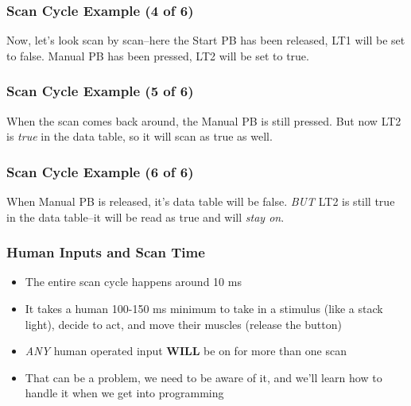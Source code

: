 \begin{frame}
    \frametitle{Scan Cycle Example (4 of 6)}

    \begin{figure}
        \centering
        \resizebox{0.75\linewidth}{!}{
            
        }
    \end{figure}

    \vspace{0.5em}
    \centering
    {\footnotesize Now, let's look scan by scan--here the Start PB has been released, LT1 will be set to false. Manual PB has been pressed, LT2 will be set to true.\par}
\end{frame}

\begin{frame}
    \frametitle{Scan Cycle Example (5 of 6)}

    \begin{figure}
        \centering
        \resizebox{0.75\linewidth}{!}{
            
        }
    \end{figure}

    \vspace{0.5em}
    \centering
    {\footnotesize When the scan comes back around, the Manual PB is still pressed. But now LT2 is \emph{true} in the data table, so it will scan as true as well.\par}
\end{frame}

\begin{frame}
    \frametitle{Scan Cycle Example (6 of 6)}

    \begin{figure}
        \centering
        \resizebox{0.75\linewidth}{!}{
            
        }
    \end{figure}

    \vspace{0.5em}
    \centering
    {\footnotesize When Manual PB is released, it's data table will be false. \emph{BUT} LT2 is still true in the data table--it will be read as true and will \emph{stay on}.\par}
\end{frame}

\begin{frame}
    \frametitle{Human Inputs and Scan Time}

    \begin{itemize}
        \item The entire scan cycle happens around 10 ms
        \item It takes a human 100-150 ms minimum to take in a stimulus (like a stack light), decide to act, and move their muscles (release the button)
        \item \emph{ANY} human operated input \textbf{WILL} be on for more than one scan
        \item That can be a problem, we need to be aware of it, and we'll learn how to handle it when we get into programming
    \end{itemize}
\end{frame}


